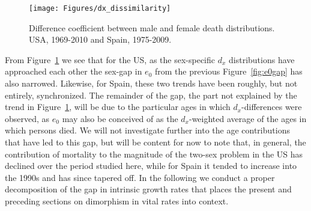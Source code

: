 \begin{figure}[!ht]
  \centering
    \caption{Difference coefficient between male and female death distributions.
    USA, 1969-2010 and Spain, 1975-2009.}
     \texttt{[image: Figures/dx\_dissimilarity]}
     \label{fig:dxtheta}
\end{figure}

From Figure~\ref{fig:dxtheta} we see that for the US, as the sex-specific $d_x$
distributions have approached each other the sex-gap in $e_0$ from the previous
Figure~\ref{fig:e0gap} has also narrowed. Likewise, for Spain, these two trends
have been roughly, but not entirely, synchronized. The remainder of the gap, the
part not explained by the trend in Figure~\ref{fig:dxtheta}, will be due to the
particular ages in which $d_x$-differences were observed, as $e_0$ may also be
conceived of as the $d_x$-weighted average of the ages in which persons died. We
will not investigate further into the age contributions that have led to this
gap, but will be content for now to note that, in general, the
contribution of mortality to the magnitude of the two-sex problem in the US has
declined over the period studied here, while for Spain it tended to increase 
into the 1990s and has since tapered off. In the following we conduct
a proper decomposition of the gap in intrinsic growth rates that places the
present and preceding sections on dimorphism in vital rates into context.

 \FloatBarrier
